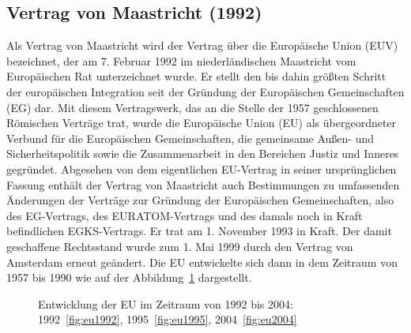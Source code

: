 \subsection{Vertrag von Maastricht (1992)}\label{subsec:maastricht}

Als Vertrag von Maastricht wird der Vertrag über die Europäische Union (EUV) bezeichnet, der am 7. Februar 1992 im niederländischen Maastricht vom Europäischen Rat unterzeichnet wurde. Er stellt den bis dahin größten Schritt der europäischen Integration seit der Gründung der Europäischen Gemeinschaften (EG) dar.\newline
Mit diesem Vertragswerk, das an die Stelle der 1957 geschlossenen Römischen Verträge trat, wurde die Europäische Union (EU) als übergeordneter Verbund für die Europäischen Gemeinschaften, die gemeinsame Außen- und Sicherheitspolitik sowie die Zusammenarbeit in den Bereichen Justiz und Inneres gegründet.  \newline
Abgesehen von dem eigentlichen EU-Vertrag in seiner ursprünglichen Fassung enthält der Vertrag von Maastricht auch Bestimmungen zu umfassenden Änderungen der Verträge zur Gründung der Europäischen Gemeinschaften, also des EG-Vertrags, des EURATOM-Vertrags und des damals noch in Kraft befindlichen EGKS-Vertrags. Er trat am 1. November 1993 in Kraft. Der damit geschaffene Rechtsstand wurde zum 1. Mai 1999 durch den Vertrag von Amsterdam erneut geändert. \newline
Die EU entwickelte sich dann in dem Zeitraum von 1957 bis 1990 wie auf der Abbildung~\ref{fig:eu1992Bis2004} dargestellt. 

\begin{figure}[H]
    \centering
    \caption{Entwicklung der EU im Zeitraum von 1992 bis 2004: 1992~\ref{fig:eu1992}, 1995~\ref{fig:eu1995}, 2004~\ref{fig:eu2004}}
    \label{fig:eu1992Bis2004}
\end{figure}

